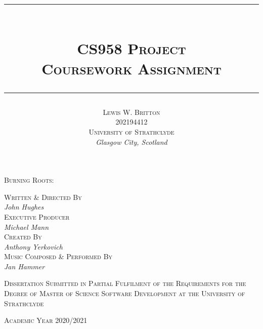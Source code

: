 \documentclass[11pt, english]{article}
\newcommand{\HRule}[1]{\rule{\linewidth}{#1}}
\begin{document}


	\title{
                \HRule{0.5pt}\\ [0.3cm]
                \huge\textsc{CS958 Project}\\
                \Large\textsc{Coursework Assignment}\\ [0.25cm]
                \HRule{0.5pt}
                }
	\author{\textsc{Lewis W. Britton}\\
                \textsc{202194412}\\
                \textsc{University of Strathclyde}\\
		\textit{Glasgow City, Scotland}
                }
	\date{}
	\maketitle

        \begin{center}
                \textsc{Burning Roots: }
        \end{center}

        \vspace{\fill}

	\begin{center}
		\textsc{Written \& Directed By}\\ \textit{John Hughes}\\
		\textsc{Executive Producer}\\ \textit{Michael Mann}\\
		\textsc{Created By}\\ \textit{Anthony Yerkovich}\\
		\textsc{Music Composed \& Performed By}\\ \textit{Jan Hammer}
	\end{center}

	\begin{center}
	\end{center}

	\begin{center}
        	\textsc{Dissertation Submitted in Partial Fulfilment of the Requirements for the Degree of Master of Science Software Development at the University of Strathclyde}
	\end{center}

	\begin{center}
		\textsc{Academic Year 2020/2021}
	\end{center}
\end{document}
